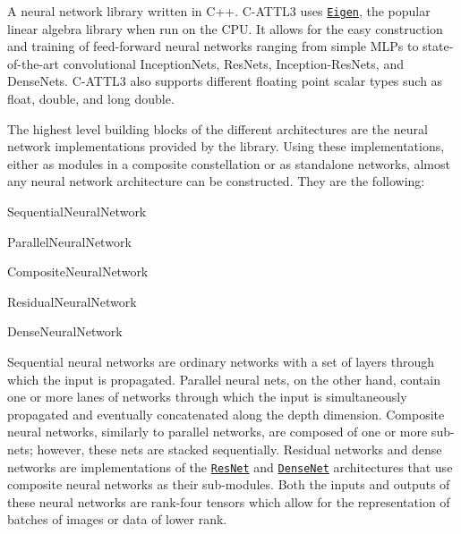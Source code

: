 A neural network library written in C++. C-\/\+A\+T\+T\+L3 uses \href{http://eigen.tuxfamily.org}{\tt Eigen}, the popular linear algebra library when run on the C\+PU. It allows for the easy construction and training of feed-\/forward neural networks ranging from simple M\+L\+Ps to state-\/of-\/the-\/art convolutional Inception\+Nets, Res\+Nets, Inception-\/\+Res\+Nets, and Dense\+Nets. C-\/\+A\+T\+T\+L3 also supports different floating point scalar types such as {\ttfamily float}, {\ttfamily double}, and {\ttfamily long double}.

The highest level building blocks of the different architectures are the neural network implementations provided by the library. Using these implementations, either as modules in a composite constellation or as standalone networks, almost any neural network architecture can be constructed. They are the following\+:
\begin{DoxyItemize}
\item Sequential\+Neural\+Network
\item Parallel\+Neural\+Network
\item Composite\+Neural\+Network
\item Residual\+Neural\+Network
\item Dense\+Neural\+Network
\end{DoxyItemize}

Sequential neural networks are ordinary networks with a set of layers through which the input is propagated. Parallel neural nets, on the other hand, contain one or more \textquotesingle{}lanes\textquotesingle{} of networks through which the input is simultaneously propagated and eventually concatenated along the depth dimension. Composite neural networks, similarly to parallel networks, are composed of one or more sub-\/nets; however, these nets are stacked sequentially. Residual networks and dense networks are implementations of the \href{https://arxiv.org/abs/1512.03385}{\tt Res\+Net} and \href{https://arxiv.org/abs/1608.06993}{\tt Dense\+Net} architectures that use composite neural networks as their sub-\/modules. Both the inputs and outputs of these neural networks are rank-\/four tensors which allow for the representation of batches of images or data of lower rank.

